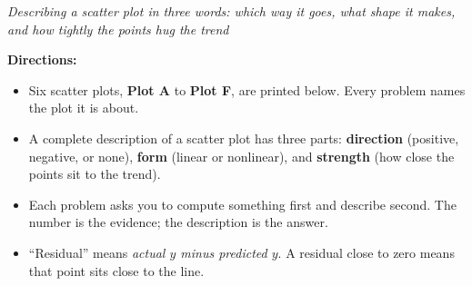 \documentclass[12pt]{article}
\begin{document}

\begin{center}\small\textit{Describing a scatter plot in three words: which way it goes,
what shape it makes, and how tightly the points hug the trend}\end{center}

\noindent\small\textbf{Directions:}
\begin{itemize}[label={$\bullet$}, leftmargin=1.1cm, itemsep=1pt, topsep=2pt]
  \item Six scatter plots, \textbf{Plot A} to \textbf{Plot F}, are printed below. Every
        problem names the plot it is about.
  \item A complete description of a scatter plot has three parts:
        \textbf{direction} (positive, negative, or none), \textbf{form} (linear or
        nonlinear), and \textbf{strength} (how close the points sit to the trend).
  \item Each problem asks you to compute something first and describe second. The number
        is the evidence; the description is the answer.
  \item ``Residual'' means \emph{actual $y$ minus predicted $y$}. A residual close to zero
        means that point sits close to the line.
\end{itemize}
\normalsize
\end{document}
